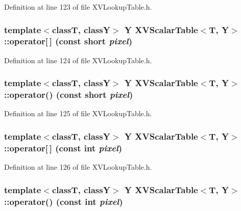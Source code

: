 Definition at line 123 of file XVLookup\-Table.h.\label{XVScalarTable_a8}
\hypertarget{class_XVScalarTable_a8}{
\subsubsection[operator{}]{\setlength{\rightskip}{0pt plus 5cm}template$<$classT, classY$>$ Y XVScalar\-Table$<$T, Y$>$::operator\mbox{[}$\,$\mbox{]} (const short {\em pixel})}}




Definition at line 124 of file XVLookup\-Table.h.\label{XVScalarTable_a9}
\hypertarget{class_XVScalarTable_a9}{
\subsubsection[operator()]{\setlength{\rightskip}{0pt plus 5cm}template$<$classT, classY$>$ Y XVScalar\-Table$<$T, Y$>$::operator() (const short {\em pixel})}}




Definition at line 125 of file XVLookup\-Table.h.\label{XVScalarTable_a10}
\hypertarget{class_XVScalarTable_a10}{
\subsubsection[operator{}]{\setlength{\rightskip}{0pt plus 5cm}template$<$classT, classY$>$ Y XVScalar\-Table$<$T, Y$>$::operator\mbox{[}$\,$\mbox{]} (const int {\em pixel})}}




Definition at line 126 of file XVLookup\-Table.h.\label{XVScalarTable_a11}
\hypertarget{class_XVScalarTable_a11}{
\subsubsection[operator()]{\setlength{\rightskip}{0pt plus 5cm}template$<$classT, classY$>$ Y XVScalar\-Table$<$T, Y$>$::operator() (const int {\em pixel})}}




